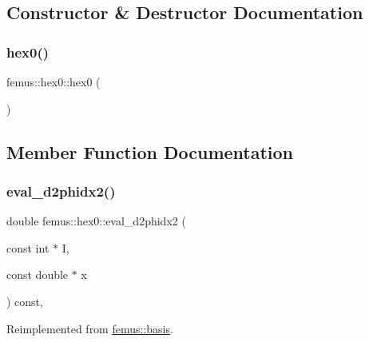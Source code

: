 \subsection{Constructor \& Destructor Documentation}
\mbox{\label{classfemus_1_1hex0_af7dde8d364c2f19cc1aa5e69192801e4}} 
\subsubsection{\texorpdfstring{hex0()}{hex0()}}
{\footnotesize\ttfamily femus\+::hex0\+::hex0 (\begin{DoxyParamCaption}{ }\end{DoxyParamCaption})\hspace{0.3cm}{\ttfamily [inline]}}



\subsection{Member Function Documentation}
\mbox{\label{classfemus_1_1hex0_af280499bcecfb346586a8a5aca7bc152}} 
\subsubsection{\texorpdfstring{eval\+\_\+d2phidx2()}{eval\_d2phidx2()}}
{\footnotesize\ttfamily double femus\+::hex0\+::eval\+\_\+d2phidx2 (\begin{DoxyParamCaption}\item[{const int $\ast$}]{I,  }\item[{const double $\ast$}]{x }\end{DoxyParamCaption}) const\hspace{0.3cm}{\ttfamily [inline]}, {\ttfamily [virtual]}}



Reimplemented from \mbox{\hyperlink{classfemus_1_1basis_a0a9839e75d1c9c8302486fc072eed028}{femus\+::basis}}.

\mbox{\label{classfemus_1_1hex0_a6fa5e53143dc6f1d3d41a63a26d7ac59}} 
